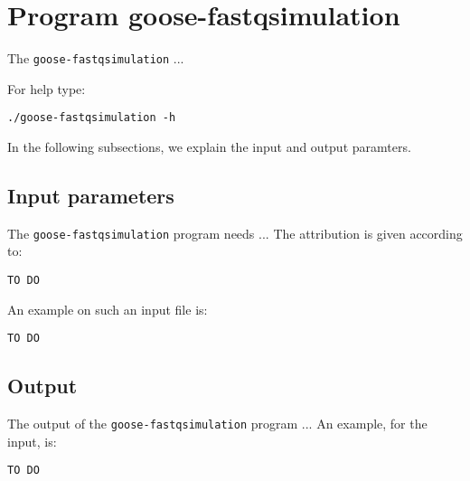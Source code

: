 \section{Program goose-fastqsimulation}
The \texttt{goose-fastqsimulation} ...

For help type:
\begin{lstlisting}
./goose-fastqsimulation -h
\end{lstlisting}
In the following subsections, we explain the input and output paramters.

\subsection{Input parameters}

The \texttt{goose-fastqsimulation} program needs ...
The attribution is given according to:
\begin{lstlisting}
TO DO
\end{lstlisting}

An example on such an input file is:
\begin{lstlisting}
TO DO
\end{lstlisting}

\subsection{Output}
The output of the \texttt{goose-fastqsimulation} program ...
An example, for the input, is:
\begin{lstlisting}
TO DO
\end{lstlisting}
